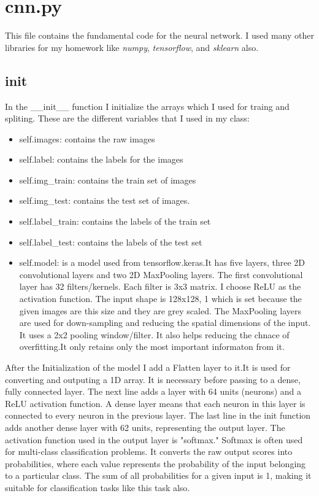 \documentclass[11pt,a4paper,oneside]{report}
\begin{document}
\section{cnn.py}

This file contains the fundamental code for the neural network. I used many other libraries for my homework like \emph{numpy}, \emph{tensorflow}, and \emph{sklearn} also.

\subsection{init}
In the \_\_init\_\_ function I initialize the arrays which I used for traing and spliting. These are the different variables that I used in my class:
\begin{itemize}
  \item self.images: contains the raw images
  \item self.label: contains the labels for the images
  \item self.img\_train: contains the train set of images
  \item self.img\_test: contains the test set of images.
  \item self.label\_train: contains the labels of the train set
  \item self.label\_test: contains the labels of the test set
  \item self.model: is a model used from tensorflow.keras.It has five layers, three 2D convolutional layers  and two 2D MaxPooling layers.
        The first convolutional layer has 32 filters/kernels. Each filter is 3x3 matrix. I choose ReLU as the activation function.
        The input shape is 128x128, 1 which is set because the given images are this size and they are grey scaled.
        The MaxPooling layers are used for down-sampling and reducing the spatial dimensions of the input.
        It uses a 2x2 pooling window/filter. It also helps reducing the chnace of overfitting.It only retains only the most important informaton from it.
\end{itemize}
After the Initialization of the model I add a Flatten layer to it.It is used for converting and outputing a 1D array.
It is necessary before passing to a dense, fully connected layer. The next line adds a layer with 64 units (neurons) and a ReLU activation function.
A dense layer means that each neuron in this layer is connected to every neuron in the previous layer. The last line in the init function adds another dense layer with 62 units, representing the output layer.
The activation function used in the output layer is "softmax." Softmax is often used for multi-class classification problems. It converts the raw output scores into probabilities, where each value represents the probability of the input belonging to a particular class.
The sum of all probabilities for a given input is 1, making it suitable for classification tasks like this task also.
\end{document}
